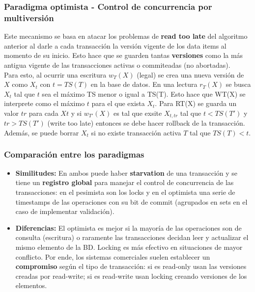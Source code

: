 \subsubsection*{Paradigma optimista - Control de concurrencia por multiversión}
Este mecanismo se basa en atacar los problemas de \textbf{read too late} del algoritmo anterior al darle a cada transacción la versión vigente de los data items al momento de su inicio. Esto hace que se guarden tantas \textbf{versiones} como la más antigua vigente de las transacciones activas o commiteadas (no abortadas). \\
Para esto, al ocurrir una escritura $w_T(X)$ (legal) se crea una nueva versión de $X$ como $X_t$ con $t = TS(T)$ en la base de datos. En una lectura $r_T(X)$ se busca $X_t$ tal que $t$ sea el máximo TS menor o igual a TS(T). Esto hace que WT(X) se interprete como el máximo $t$ para el que exista $X_t$. Para RT(X) se guarda un valor $tr$ para cada $Xt$ y si $w_{T'}(X)$ es tal que exsite $X_{t,tr}$ tal que $t < TS(T')$ y $tr > TS(T')$ (write too late) entonces se debe hacer rollback de la transacción. Además, se puede borrar $X_t$ si no existe transacción activa $T$ tal que $TS(T) < t$.

\subsubsection*{Comparación entre los paradigmas}
\begin{itemize}
    \item \textbf{Similitudes:} En ambos puede haber \textbf{starvation} de una transacción y se tiene un \textbf{registro global} para manejar el control de concurrencia de las transacciones: en el pesimista son los locks y en el optimista una serie de timestamps de las operaciones con su bit de commit (agrupados en sets en el caso de implementar validación).
    \item \textbf{Diferencias:} El optimista es mejor si la mayoría de las operaciones son de consulta (escritura) o raramente las transacciones decidan leer y actualizar el mismo elemento de la BD. Locking es más efectivo en situaciones de mayor conflicto. Por ende, los sistemas comerciales suelen establecer un \textbf{compromiso} según el tipo de transacción: si es read-only usan las versiones creadas por read-write; si es read-write usan locking creando versiones de los elementos.
\end{itemize}

